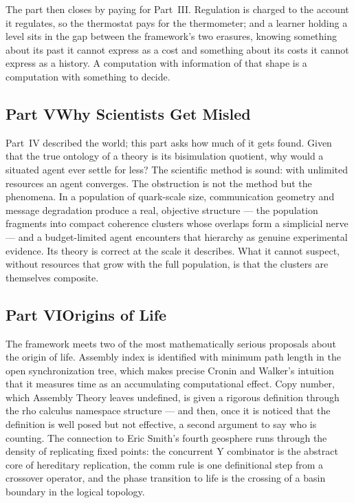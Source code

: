\documentclass[12pt,openright,twoside]{book}
\theoremstyle{remark}
\theoremstyle{plain}
\theoremstyle{remark}
\theoremstyle{plain}
\theoremstyle{plain}
\begin{document}
The part then closes by paying for Part~III.
Regulation is charged to the account it regulates, so the thermostat pays
for the thermometer; and a learner holding a level sits in the gap
between the framework's two erasures, knowing something about its past it
cannot express as a cost and something about its costs it cannot express
as a history.
A computation with information of that shape is a computation with
something to decide.

\subsection*{Part V\quad Why Scientists Get Misled}

Part~IV described the world; this part asks how much of it gets found.
Given that the true ontology of a theory is its bisimulation quotient,
why would a situated agent ever settle for less?
The scientific method is sound: with unlimited resources an agent
converges.
The obstruction is not the method but the phenomena.
In a population of quark-scale size, communication geometry and message
degradation produce a real, objective structure --- the population
fragments into compact coherence clusters whose overlaps form a
simplicial nerve --- and a budget-limited agent encounters that hierarchy
as genuine experimental evidence.
Its theory is correct at the scale it describes.
What it cannot suspect, without resources that grow with the full
population, is that the clusters are themselves composite.

\subsection*{Part VI\quad Origins of Life}

The framework meets two of the most mathematically serious proposals
about the origin of life.
Assembly index is identified with minimum path length in the open
synchronization tree, which makes precise Cronin and Walker's intuition
that it measures time as an accumulating computational effect.
Copy number, which Assembly Theory leaves undefined, is given a rigorous
definition through the rho calculus namespace structure --- and then, once
it is noticed that the definition is well posed but not effective, a
second argument to say who is counting.
The connection to Eric Smith's fourth geosphere runs through the density
of replicating fixed points: the concurrent Y combinator is the abstract
core of hereditary replication, the comm rule is one definitional step
from a crossover operator, and the phase transition to life is the
crossing of a basin boundary in the logical topology.
\end{document}
